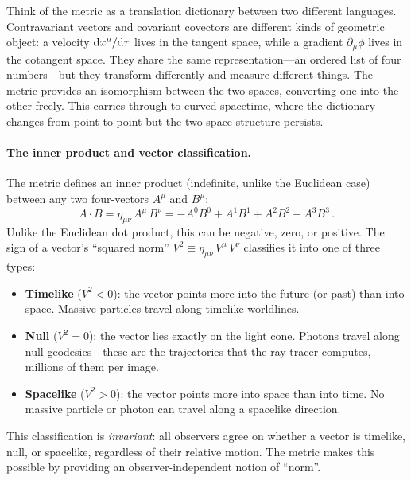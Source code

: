 Think of the metric as a translation dictionary between two different
languages.  Contravariant vectors and covariant covectors are different kinds of
geometric object: a velocity $\mathrm{d} x^\mu / \mathrm{d}\tau$ lives in the tangent space,
while a gradient $\partial_\mu \phi$ lives in the cotangent space.  They share
the same representation---an ordered list of four numbers---but they transform
differently and measure different things.  The metric provides an isomorphism
between the two spaces, converting one into the other freely.  This carries
through to curved spacetime, where the dictionary changes from point to point
but the two-space structure persists.

\paragraph{The inner product and vector classification.}

The metric defines an inner product (indefinite, unlike the Euclidean case)
between any two four-vectors $A^\mu$ and $B^\mu$:
%
\begin{equation}
  A \cdot B
    = \eta_{\mu\nu}\, A^\mu\, B^\nu
    = -A^0 B^0 + A^1 B^1 + A^2 B^2 + A^3 B^3 \,.
  \label{eq:minkowski-inner-product}
\end{equation}
%
Unlike the Euclidean dot product, this can be negative, zero, or positive.  The
sign of a vector's ``squared norm'' $V^2 \equiv \eta_{\mu\nu}\,V^\mu\,V^\nu$
classifies it into one of three types:
%
\begin{itemize}
  \item \textbf{Timelike} ($V^2 < 0$): the vector points more into the future
    (or past) than into space.  Massive particles travel along timelike
    worldlines.
  \item \textbf{Null} ($V^2 = 0$): the vector lies exactly on the light cone.
    Photons travel along null geodesics---these are the trajectories that the
    ray tracer computes, millions of them per image.
  \item \textbf{Spacelike} ($V^2 > 0$): the vector points more into space
    than into time.  No massive particle or photon can travel along a spacelike
    direction.
\end{itemize}
%
This classification is \emph{invariant}: all observers agree on whether a
vector is timelike, null, or spacelike, regardless of their relative motion.
The metric makes this possible by providing an observer-independent notion of
``norm''.

